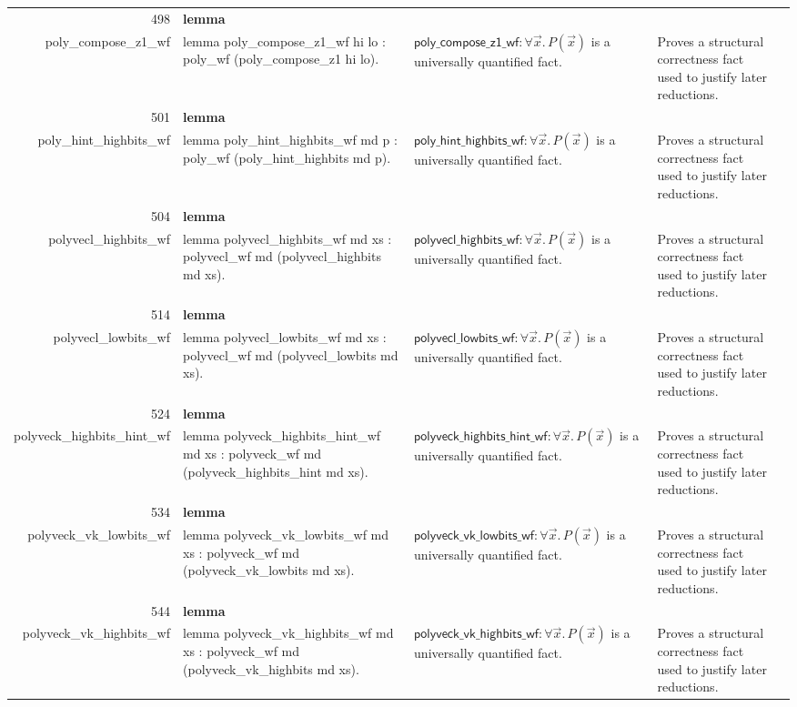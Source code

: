 \documentclass[10pt]{article}
\newcommand{\ec}[1]{\begingroup\ttfamily\scriptsize #1\endgroup}
\begin{document}
\begin{longtable}{r L{0.17\textwidth} L{0.26\textwidth} L{0.27\textwidth} L{0.20\textwidth}}
498 & \textbf{lemma}\\\ec{poly\_compose\_z1\_wf} & \ec{lemma poly\_compose\_z1\_wf hi lo : poly\_wf (poly\_compose\_z1 hi lo).} & \(\mathsf{poly\_compose\_z1\_wf} : \forall \vec{x}.\, P(\vec{x})\) is a universally quantified fact. & Proves a structural correctness fact used to justify later reductions. \\
501 & \textbf{lemma}\\\ec{poly\_hint\_highbits\_wf} & \ec{lemma poly\_hint\_highbits\_wf md p : poly\_wf (poly\_hint\_highbits md p).} & \(\mathsf{poly\_hint\_highbits\_wf} : \forall \vec{x}.\, P(\vec{x})\) is a universally quantified fact. & Proves a structural correctness fact used to justify later reductions. \\
504 & \textbf{lemma}\\\ec{polyvecl\_highbits\_wf} & \ec{lemma polyvecl\_highbits\_wf md xs : polyvecl\_wf md (polyvecl\_highbits md xs).} & \(\mathsf{polyvecl\_highbits\_wf} : \forall \vec{x}.\, P(\vec{x})\) is a universally quantified fact. & Proves a structural correctness fact used to justify later reductions. \\
514 & \textbf{lemma}\\\ec{polyvecl\_lowbits\_wf} & \ec{lemma polyvecl\_lowbits\_wf md xs : polyvecl\_wf md (polyvecl\_lowbits md xs).} & \(\mathsf{polyvecl\_lowbits\_wf} : \forall \vec{x}.\, P(\vec{x})\) is a universally quantified fact. & Proves a structural correctness fact used to justify later reductions. \\
524 & \textbf{lemma}\\\ec{polyveck\_highbits\_hint\_wf} & \ec{lemma polyveck\_highbits\_hint\_wf md xs : polyveck\_wf md (polyveck\_highbits\_hint md xs).} & \(\mathsf{polyveck\_highbits\_hint\_wf} : \forall \vec{x}.\, P(\vec{x})\) is a universally quantified fact. & Proves a structural correctness fact used to justify later reductions. \\
534 & \textbf{lemma}\\\ec{polyveck\_vk\_lowbits\_wf} & \ec{lemma polyveck\_vk\_lowbits\_wf md xs : polyveck\_wf md (polyveck\_vk\_lowbits md xs).} & \(\mathsf{polyveck\_vk\_lowbits\_wf} : \forall \vec{x}.\, P(\vec{x})\) is a universally quantified fact. & Proves a structural correctness fact used to justify later reductions. \\
544 & \textbf{lemma}\\\ec{polyveck\_vk\_highbits\_wf} & \ec{lemma polyveck\_vk\_highbits\_wf md xs : polyveck\_wf md (polyveck\_vk\_highbits md xs).} & \(\mathsf{polyveck\_vk\_highbits\_wf} : \forall \vec{x}.\, P(\vec{x})\) is a universally quantified fact. & Proves a structural correctness fact used to justify later reductions. \\

\end{longtable}
\end{document}

